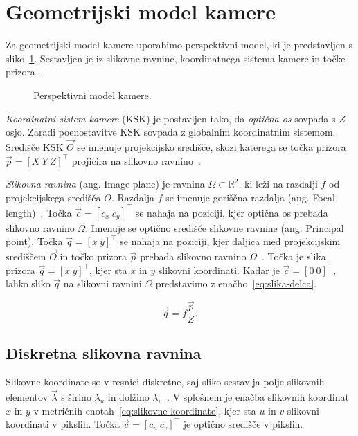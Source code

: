 \section{Geometrijski model kamere}\label{sec:model-kamere}
Za geometrijski model kamere uporabimo perspektivni model, ki je predstavljen s sliko~\ref{fig:perspektivni-model}. Sestavljen je iz slikovne ravnine, koordinatnega sistema kamere in točke prizora~\cite{trucco1998introductory}.


\begin{figure}[htb]
\centering

\caption[Perspektivni model kamere]{Perspektivni model kamere.}
\label{fig:perspektivni-model}
\end{figure}


\emph{Koordinatni sistem kamere} (KSK) je postavljen tako, da \emph{optična os} sovpada s $Z$ osjo. Zaradi poenostavitve KSK sovpada z globalnim koordinatnim sistemom.  Središče KSK $\vec{O}$ se imenuje projekcijsko središče, skozi katerega se točka prizora $\vec{p} = \left[ X~Y~Z \right]^\top$ projicira na slikovno ravnino~\cite{trucco1998introductory}.

\emph{Slikovna ravnina} (ang. Image plane) je ravnina $\varOmega \subset \mathbb{R}^2$, ki leži na razdalji $f$ od projekcijskega središča $O$. Razdalja $f$ se imenuje goriščna razdalja (ang. Focal length)~\cite{trucco1998introductory}. Točka $\vec{c} = \left[c_x~c_y \right]^\top$ se nahaja na poziciji, kjer optična os prebada slikovno ravnino $\varOmega$. Imenuje se optično središče slikovne ravnine (ang. Principal point). Točka $\vec{q} = [x~y]^\top$ se nahaja na poziciji, kjer daljica med projekcijskim središčem $\vec{O}$ in točko prizora $\vec{p}$ prebada slikovno ravnino $\varOmega$~\cite{trucco1998introductory}. Točka je slika prizora $\vec{q} = [x~y]^\top$, kjer sta $x$ in $y$ slikovni koordinati. Kadar je $\vec{c} = \left[0~0\right]^\top$, lahko sliko $\vec{q}$ na slikovni ravnini $\varOmega$ predstavimo z enačbo~\eqref{eq:slika-delca}.

\begin{equation}
	\vec{q} = f \frac{\vec{p}}{Z}.
    \label{eq:slika-delca}
\end{equation}

\subsection{Diskretna slikovna ravnina}
Slikovne koordinate so v resnici diskretne, saj sliko sestavlja polje slikovnih elementov $\vec{\lambda}$ s širino $\lambda_u$ in dolžino $\lambda_v$~\cite{trucco1998introductory}. V splošnem je enačba slikovnih koordinat $x$ in $y$ v metričnih enotah~\eqref{eq:slikovne-koordinate}, kjer sta $u$ in $v$ slikovni koordinati v pikslih. Točka $\vec{c} = \left[c_u~c_v \right]^\top$ je optično središče v pikslih.

